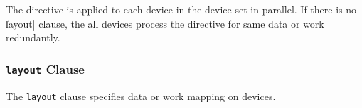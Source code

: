 The directive is applied to each device in the device set in parallel.
If there is no \|layout| clause, the all devices process the
directive for same data or work redundantly.



\subsubsection{{\tt layout} Clause}


The {\tt layout} clause specifies data or work mapping on devices.



